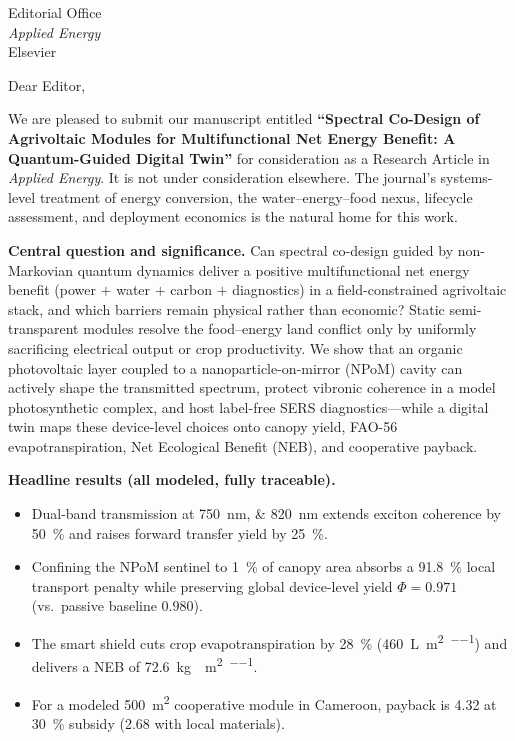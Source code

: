 \documentclass[10pt]{letter}
\begin{document}
\sloppy

\begin{letter}{Editorial Office\\
\textit{Applied Energy}\\
Elsevier}

\opening{Dear Editor,}

We are pleased to submit our manuscript entitled \textbf{``Spectral Co-Design of Agrivoltaic Modules for Multifunctional Net Energy Benefit: A Quantum-Guided Digital Twin''} for consideration as a Research Article in \textit{Applied Energy}. It is not under consideration elsewhere. The journal's systems-level treatment of energy conversion, the water--energy--food nexus, lifecycle assessment, and deployment economics is the natural home for this work.

\noindent\textbf{Central question and significance.}
Can spectral co-design guided by non-Markovian quantum dynamics deliver a positive multifunctional net energy benefit (power $+$ water $+$ carbon $+$ diagnostics) in a field-constrained agrivoltaic stack, and which barriers remain physical rather than economic? Static semi-transparent modules resolve the food--energy land conflict only by uniformly sacrificing electrical output or crop productivity. We show that an organic photovoltaic layer coupled to a nanoparticle-on-mirror (NPoM) cavity can actively shape the transmitted spectrum, protect vibronic coherence in a model photosynthetic complex, and host label-free SERS diagnostics---while a digital twin maps these device-level choices onto canopy yield, FAO-56 evapotranspiration, Net Ecological Benefit (NEB), and cooperative payback.

\noindent\textbf{Headline results (all modeled, fully traceable).}
\begin{itemize}
\item Dual-band transmission at \qtylist{750;820}{\nm} extends exciton coherence by \qty{50}{\percent} and raises forward transfer yield by \qty{25}{\percent}.
\item Confining the NPoM sentinel to \qty{1}{\percent} of canopy area absorbs a \qty{91.8}{\percent} local transport penalty while preserving global device-level yield $\Phi = \num{0.971}$ (vs.\ passive baseline $0.980$).
\item The smart shield cuts crop evapotranspiration by \qty{28}{\percent} (\qty{460}{\L\per\m\squared\per\yr}) and delivers a NEB of \qty{72.6}{\kg{}\per\m\squared\per\yr}.
\item For a modeled \qty{500}{\m\squared} cooperative module in Cameroon, payback is \qty{4.32}{\yr} at \qty{30}{\percent} subsidy (\qty{2.68}{\yr} with local materials).
\end{itemize}


\end{letter}
\end{document}
